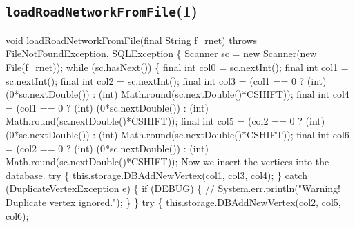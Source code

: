 \subsection{\texttt{loadRoadNetworkFromFile}(1)}
\nwenddocs{}\endmoddef{}
void loadRoadNetworkFromFile(final String f_rnet) throws FileNotFoundException, SQLException \{
  Scanner sc = new Scanner(new File(f_rnet));
  while (sc.hasNext()) \{
\eatline
{}\nwendcode{}
\nwenddocs{}\plusendmoddef
final int col0 = sc.nextInt();
final int col1 = sc.nextInt();
final int col2 = sc.nextInt();
final int col3 = (col1 == 0 ? (int) (0*sc.nextDouble()) : (int) Math.round(sc.nextDouble()*CSHIFT));
final int col4 = (col1 == 0 ? (int) (0*sc.nextDouble()) : (int) Math.round(sc.nextDouble()*CSHIFT));
final int col5 = (col2 == 0 ? (int) (0*sc.nextDouble()) : (int) Math.round(sc.nextDouble()*CSHIFT));
final int col6 = (col2 == 0 ? (int) (0*sc.nextDouble()) : (int) Math.round(sc.nextDouble()*CSHIFT));
\nwendcode{}\nwdocspar
{\small Now we insert the vertices into the database.}
\nwenddocs{}\plusendmoddef
try \{
  this.storage.DBAddNewVertex(col1, col3, col4);
\} catch (DuplicateVertexException e) \{
  if (DEBUG) \{
    // System.err.println("Warning! Duplicate vertex ignored.");
  \}
\}
try \{
  this.storage.DBAddNewVertex(col2, col5, col6);
